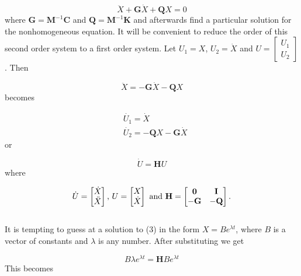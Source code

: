 \documentclass{article}
\begin{document}
				\begin{equation}
					\ddot{X}+\textbf{G}\dot{X}+\textbf{Q}X = 0
				\end{equation}
where $\textbf{G} = \textbf{M}^{-1}\textbf{C}$ and $\textbf{Q} = \textbf{M}^{-1} \textbf{K}$ and afterwards find a particular solution for the nonhomogeneous equation. It will be convenient to reduce the order of this second order system to a first order system. Let $U_1 = X$, $U_2 = \dot{X}$ and $U = \begin{bmatrix} U_1 \\ U_2 \end{bmatrix}$. Then

				\begin{equation*}
					\ddot{X}=-\textbf{G}\dot{X}-\textbf{Q}X
				\end{equation*}
becomes

				\begin{align*}
					&\dot{U_1}=\dot{X}\\
					&\dot{U_2}=-\textbf{Q}X-\textbf{G}\dot{X}
				\end{align*}
or 

				\begin{equation}
					\dot{U}=\textbf{H}U
				\end{equation}
where 

				\begin{equation*}
					\dot{U}=\begin{bmatrix}\dot{X}\\ \ddot{X}\end{bmatrix}\text{,     } U=\begin{bmatrix}X\\ \dot{X}\end{bmatrix} \text{     and     } \\ \\  \textbf{H} = \begin{bmatrix} \textbf{0} & \textbf{I} \\ -\textbf{G} &-\textbf{Q} \end{bmatrix}.
				\end{equation*}\\
It is tempting to guess at a solution to (3) in the form $X = Be^{\lambda t}$, where $B$ is a vector of constants and $\lambda$ is any number. After substituting we get

				\begin{equation}
					B\lambda e^{\lambda t} = \textbf{H}Be^{\lambda t}
				\end{equation}
This becomes
\end{document}
